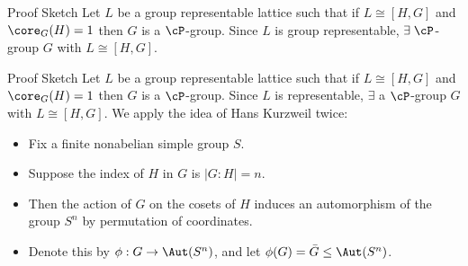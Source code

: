 \begin{frame}[label=IEPropsLemma2]{}
\alert{Proof Sketch}
\vskip2mm
  Let $L$ be a group representable lattice such that if $L\cong [H,G]$ and
  $\core_G(H)=1$ then $G$ is a $\cP$-group.  
\vskip4mm
  Since $L$ is group representable, $\exists \; \cP$-group $G$ with $L
  \cong [H,G]$. 
\vskip4mm
\end{frame}

\begin{frame}[label=IEPropsLemma2Alt]{}
\alert{Proof Sketch}
\vskip2mm
  Let $L$ be a group representable lattice such that if $L\cong [H,G]$ and
  $\core_G(H)=1$ then $G$ is a $\cP$-group.  
\vskip4mm
  Since $L$ is representable, $\exists$ a $\cP$-group $G$ with $L
  \cong [H,G]$. 
\vskip4mm
  We apply the idea of Hans Kurzweil twice:
  \begin{itemize}
  \item Fix a finite nonabelian simple group $S$. 
\vskip2mm
\item Suppose the index of $H$ in $G$ is $|G:H| = n$.
\vskip2mm
\item Then the action of $G$ on the cosets of $H$ induces an automorphism of the
group $S^n$ by permutation of coordinates.  
\vskip2mm
\item
Denote this by  $\phi: G \rightarrow \Aut(S^n)$, 
  and let $\phi(G) = \bar{G} \leq \Aut(S^n)$.  
  \end{itemize}
\end{frame}


